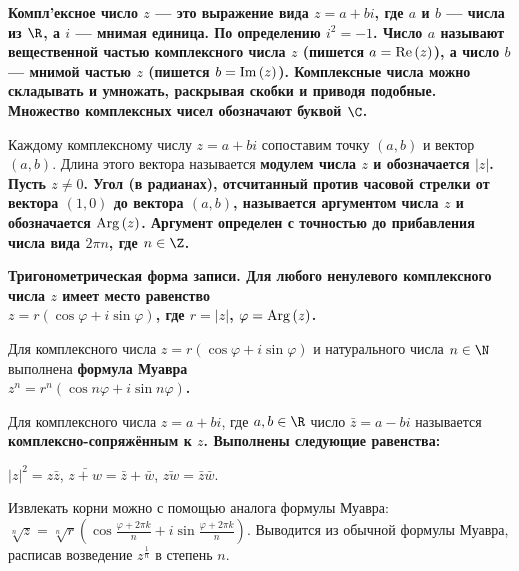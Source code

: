 \begin{solution}
\bf{Компл'ексное число} \(z\) --- это выражение вида \(z=a+bi\), где \(a\) и \(b\) --- числа из \(\R\), а \(i\) --- \bf{мнимая единица}. По определению \(i^2=-1\).
Число \(a\) называют \bf{вещественной частью} комплексного числа \(z\) (пишется \(a={\rm Re}\,(z)\)), а число \(b\) --- \bf{мнимой частью} \(z\) (пишется \(b={\rm Im}\,(z)\)).
Комплексные числа можно складывать и умножать, \lgq раскрывая скобки и приводя подобные\rgq. Множество комплексных чисел обозначают буквой \(\C\).

Каждому комплексному числу \(z=a+bi\) сопоставим точку \((a,b)\) и вектор \((a,b)\). Длина этого вектора называется \bf{модулем} числа \(z\) и обозначается \(|z|\). Пусть \(z\ne0\).
Угол (в радианах), отсчитанный против часовой стрелки от вектора \((1,0)\) до вектора \((a,b)\), называется \bf{аргументом} числа \(z\) и обозначается \({\rm Arg}\,(z)\). Аргумент определен с точностью до прибавления числа вида \(2\pi n\), где \(n\in\Z\).

\bf{Тригонометрическая форма записи.} Для любого ненулевого комплексного числа \(z\) имеет место равенство\\ \(z=r (\cos \varphi +i\sin \varphi )\), где \(r=|z|\), \(\varphi={\rm Arg}\,(z)\).

Для комплексного числа \(z=r(\cos\varphi+i\sin\varphi)\) и натурального числа \(n\in\N\) выполнена \bf{формула Муавра}\\
\(z^n=r^n(\cos n\varphi+i\sin n\varphi)\).

Для комплексного числа \(z=a+bi\), где \(a,b\in \R\) число \(\bar{z}=a-bi\) называется \bf{комплексно-сопряжённым} к \(z\). Выполнены следующие равенства:

\(|z|^2=z\bar{z}\), \(\bar{z+w} = \bar{z} + \bar{w}\), \(\bar{zw}= \bar{z}\bar{w}\).

Извлекать корни можно с помощью аналога формулы Муавра: $\sqrt[n]{z}=\sqrt[n]{r}(\cos \frac{\varphi+2\pi k}{n}+i\sin \frac{\varphi+2\pi k}{n})$. Выводится из обычной формулы Муавра, расписав возведение $z^{\frac{1}{n}}$ в степень $n$.
\end{solution}

